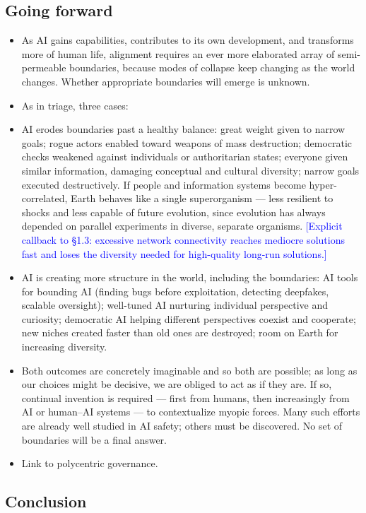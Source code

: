 \documentclass[11pt]{article}
\newcommand{\note}[1]{{\footnotesize\textcolor{blue}{[#1]}}}
\begin{document}
\subsection*{Going forward}

\begin{itemize}
  \item As AI gains capabilities, contributes to its own development, and transforms more of human life, alignment requires an ever more elaborated array of semi-permeable boundaries, because modes of collapse keep changing as the world changes. Whether appropriate boundaries will emerge is unknown. 
  \item As in triage, three cases:
  \item AI erodes boundaries past a healthy balance: great weight given to narrow goals; rogue actors enabled toward weapons of mass destruction; democratic checks weakened against individuals or authoritarian states; everyone given similar information, damaging conceptual and cultural diversity; narrow goals executed destructively. If people and information systems become hyper-correlated, Earth behaves like a single superorganism --- less resilient to shocks and less capable of future evolution, since evolution has always depended on parallel experiments in diverse, separate organisms. \note{Explicit callback to \S1.3: excessive network connectivity reaches mediocre solutions fast and loses the diversity needed for high-quality long-run solutions.}
  \item AI is creating more structure in the world, including the boundaries: AI tools for bounding AI (finding bugs before exploitation, detecting deepfakes, scalable oversight); well-tuned AI nurturing individual perspective and curiosity; democratic AI helping different perspectives coexist and cooperate; new niches created faster than old ones are destroyed; room on Earth for increasing diversity.
  \item Both outcomes are concretely imaginable and so both are possible; as long as our choices might be decisive, we are obliged to act as if they are. If so, continual invention is required --- first from humans, then increasingly from AI or human--AI systems --- to contextualize myopic forces. Many such efforts are already well studied in AI safety; others must be discovered. No set of boundaries will be a final answer.
  \item Link to polycentric governance.
\end{itemize}

\subsection*{Conclusion}
\end{document}
